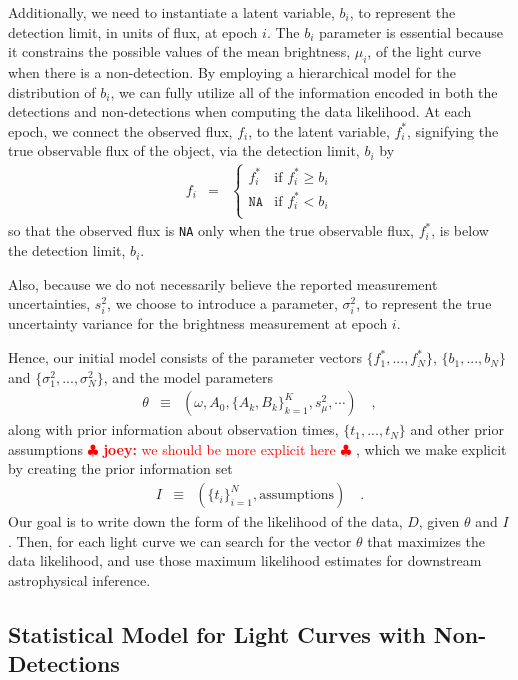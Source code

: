 \documentclass[12pt,preprint]{aastex}
\newcommand{\fobs}{f_i}
\newcommand{\sobs}{s^2_i}
\newcommand{\ftrue}{f_i^*}
\newcommand{\joey}[1] { \textcolor{red} {
\ensuremath{\clubsuit} {\bf joey:}  {#1}
\ensuremath{\clubsuit} } }%
\begin{document}
Additionally, we need to instantiate a latent variable, $b_i$, to represent the detection limit, in units of flux, at epoch $i$.  The $b_i$ parameter is essential because it constrains the possible values of the mean brightness, $\mu_i$, of the light curve when there is a non-detection.  By employing a hierarchical model for the distribution of $b_i$, we can fully utilize all of the information encoded in both the detections and non-detections when computing the data likelihood.   At each epoch, we connect the observed flux, $\fobs$, to the latent variable, $\ftrue$, signifying the true observable flux of the object, via the detection limit, $b_i$ by
\begin{eqnarray}\displaystyle
\fobs &=& \left\{\begin{array}{ll}
  \ftrue & \mbox{if $\ftrue \ge b_i$} \\
  \texttt{NA} & \mbox{if $\ftrue < b_i$} \\
\end{array} \right.
\end{eqnarray}
so that the observed flux is \texttt{NA} only when the true observable flux, $\ftrue$, is below the detection limit, $b_i$.  


Also, because we do not necessarily believe the reported measurement uncertainties, $\sobs$, we choose to introduce a parameter, $\sigma^2_i$, to represent the true uncertainty variance for the brightness measurement at epoch $i$.

Hence, our initial model consists of the parameter vectors $\{f^*_1,...,f^*_N\}$, $\{b_1,...,b_N\}$ and $\{\sigma^2_1,...,\sigma^2_N\}$, and the model parameters
\begin{eqnarray}\displaystyle
\theta &\equiv& (\omega, A_0, \{A_k, B_k\}_{k=1}^K, s^2_\mu, \cdots) \quad ,
\end{eqnarray}
along with prior information about observation times, $\{t_1,...,t_N\}$ and other prior assumptions \joey{we should be more explicit here}, which we make explicit by creating the prior information set
\begin{eqnarray}\displaystyle
I &\equiv& (\{t_i\}_{i=1}^N, \mbox{assumptions}) \quad .
\end{eqnarray}
Our goal is to write down the form of the likelihood of the data, $D$, given $\theta$ and $I$.  Then, for each light curve we can search for the vector $\theta$ that maximizes the data likelihood, and use those maximum likelihood estimates for downstream astrophysical inference.


\subsection{Statistical Model for Light Curves with Non-Detections}
\end{document}
